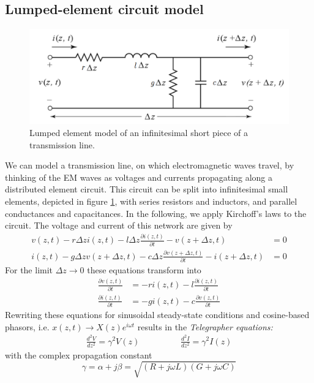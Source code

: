 \subsection{Lumped-element circuit model}
\begin{figure}
	\centering
	\includegraphics[width=0.4\linewidth]{chapter-theory/figs-RF/TL_lumped}
	\caption{Lumped element model of an infinitesimal short piece of a transmission line.}
	\label{fig:tllumped}
\end{figure}
We can model a transmission line, on which electromagnetic waves travel, by thinking of the EM waves as voltages and currents propagating along a distributed element circuit. This circuit can be split into infinitesimal small elements, depicted in figure \ref{fig:tllumped}, with series resistors and inductors, and parallel conductances and capacitances. In the following, we apply Kirchoff's laws to the circuit. The voltage and current of this network are given by
\begin{align}
v(z,t) - r\Delta z i(z,t) - l\Delta z\frac{\partial i(z,t)}{\partial t}-v(z+\Delta z,t) &=0 \\%
i(z,t) - g\Delta z v(z+\Delta z, t) - c\Delta z\frac{\partial v(z+\Delta z,t)}{\partial t} - i(z+\Delta z,t) &=0
\end{align}
For the limit $\Delta z\rightarrow0$ these equations transform into 
\begin{align}
\frac{\partial v(z,t)}{\partial t} &= -ri(z,t)-l\frac{\partial i(z,t)}{\partial t} \\%
\frac{\partial i(z,t)}{\partial t} &= -gi(z,t)-c\frac{\partial v(z,t)}{\partial t}
\end{align}
Rewriting these equations for sinusoidal steady-state conditions and cosine-based phasors, i.e. $x(z,t) \rightarrow X(z)e^{i\omega t}$ results in the \textit{Telegrapher equations:}
\begin{align}
\frac{d^2V}{dz^2} = \gamma^2V(z) \hspace{2cm} \frac{d^2I}{dz^2} = \gamma^2I(z)
\label{eq:telegraph}
\end{align}
with the complex propagation constant
\begin{equation}
\gamma = \alpha + j\beta =\sqrt{(R+j\omega L)(G+j\omega C)}
\label{eq:gamma}
\end{equation}

